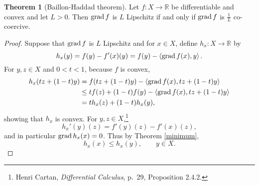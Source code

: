 \documentclass{article}
\newcommand{\inner}[2]{\left\langle #1, #2 \right\rangle}
\newcommand{\grad}{\ensuremath\mathrm{grad}\,}
\theoremstyle{definition}
\newtheorem{theorem}{Theorem}
\theoremstyle{definition}
\begin{document}
\begin{theorem}[Baillon-Haddad theorem]
Let $f:X \to \mathbb{R}$ be differentiable and convex and let $L>0$. 
Then $\grad f$ is $L$ Lipschitz if and only if $\grad f$ is $\frac{1}{L}$ co-coercive. 
\end{theorem}
\begin{proof}
Suppose that $\grad f$ is $L$ Lipschitz and
for $x \in X$, define $h_x:X \to \mathbb{R}$ by
\[
h_x(y) = f(y)-f'(x)(y) = f(y)-\inner{\grad f(x)}{y}.
\]
For $y,z \in X$ and $0<t<1$, because $f$ is convex,
\begin{align*}
h_x(tz+(1-t)y)&= f(tz+(1-t)y)-\inner{\grad f(x)}{tz+(1-t)y}\\
&\leq tf(z)+(1-t)f(y) - \inner{\grad f(x)}{tz+(1-t)y}\\
&=th_x(z)+(1-t)h_x(y),
\end{align*}
showing that $h_x$ is convex. For $y,z \in X$,\footnote{Henri Cartan, {\em Differential Calculus},
p.~29, Proposition 2.4.2.}
\[
h_x'(y)(z)=f'(y)(z)-f'(x)(z),
\]
and in particular $\grad h_x(x)=0$. Thus by Theorem \ref{minimum}, 
\begin{equation}
h_x(x) \leq h_x(y), \qquad y \in X.
\label{hx}
\end{equation}



\end{proof}
\end{document}
